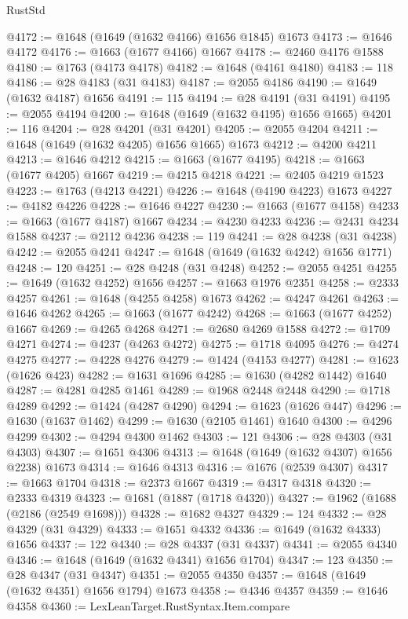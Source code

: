 \begin{lexlean}{RustStd}
\begin{coremodule}
{\begin{coremodule}
{{{{{{{{{{{{{{{{{{{{{{{{{{{{{{{{{{{{{{{{{{{{@4172 := @1648 (@1649 (@1632 @4166) @1656 @1845) @1673
@4173 := @1646 @4172
@4176 := @1663 (@1677 @4166) @1667
@4178 := @2460 @4176 @1588
@4180 := @1763 (@4173 @4178)
@4182 := @1648 (@4161 @4180)
@4183 := 118
@4186 := @28 @4183 (@31 @4183)
@4187 := @2055 @4186
@4190 := @1649 (@1632 @4187) @1656
@4191 := 115
@4194 := @28 @4191 (@31 @4191)
@4195 := @2055 @4194
@4200 := @1648 (@1649 (@1632 @4195) @1656 @1665)
@4201 := 116
@4204 := @28 @4201 (@31 @4201)
@4205 := @2055 @4204
@4211 := @1648 (@1649 (@1632 @4205) @1656 @1665) @1673
@4212 := @4200 @4211
@4213 := @1646 @4212
@4215 := @1663 (@1677 @4195)
@4218 := @1663 (@1677 @4205) @1667
@4219 := @4215 @4218
@4221 := @2405 @4219 @1523
@4223 := @1763 (@4213 @4221)
@4226 := @1648 (@4190 @4223) @1673
@4227 := @4182 @4226
@4228 := @1646 @4227
@4230 := @1663 (@1677 @4158)
@4233 := @1663 (@1677 @4187) @1667
@4234 := @4230 @4233
@4236 := @2431 @4234 @1588
@4237 := @2112 @4236
@4238 := 119
@4241 := @28 @4238 (@31 @4238)
@4242 := @2055 @4241
@4247 := @1648 (@1649 (@1632 @4242) @1656 @1771)
@4248 := 120
@4251 := @28 @4248 (@31 @4248)
@4252 := @2055 @4251
@4255 := @1649 (@1632 @4252) @1656
@4257 := @1663 @1976 @2351
@4258 := @2333 @4257
@4261 := @1648 (@4255 @4258) @1673
@4262 := @4247 @4261
@4263 := @1646 @4262
@4265 := @1663 (@1677 @4242)
@4268 := @1663 (@1677 @4252) @1667
@4269 := @4265 @4268
@4271 := @2680 @4269 @1588
@4272 := @1709 @4271
@4274 := @4237 (@4263 @4272)
@4275 := @1718 @4095
@4276 := @4274 @4275
@4277 := @4228 @4276
@4279 := @1424 (@4153 @4277)
@4281 := @1623 (@1626 @423)
@4282 := @1631 @1696
@4285 := @1630 (@4282 @1442) @1640
@4287 := @4281 @4285 @1461
@4289 := @1968 @2448 @2448
@4290 := @1718 @4289
@4292 := @1424 (@4287 @4290)
@4294 := @1623 (@1626 @447)
@4296 := @1630 (@1637 @1462)
@4299 := @1630 (@2105 @1461) @1640
@4300 := @4296 @4299
@4302 := @4294 @4300 @1462
@4303 := 121
@4306 := @28 @4303 (@31 @4303)
@4307 := @1651 @4306
@4313 := @1648 (@1649 (@1632 @4307) @1656 @2238) @1673
@4314 := @1646 @4313
@4316 := @1676 (@2539 @4307)
@4317 := @1663 @1704
@4318 := @2373 @1667
@4319 := @4317 @4318
@4320 := @2333 @4319
@4323 := @1681 (@1887 (@1718 @4320))
@4327 := @1962 (@1688 (@2186 (@2549 @1698)))
@4328 := @1682 @4327
@4329 := 124
@4332 := @28 @4329 (@31 @4329)
@4333 := @1651 @4332
@4336 := @1649 (@1632 @4333) @1656
@4337 := 122
@4340 := @28 @4337 (@31 @4337)
@4341 := @2055 @4340
@4346 := @1648 (@1649 (@1632 @4341) @1656 @1704)
@4347 := 123
@4350 := @28 @4347 (@31 @4347)
@4351 := @2055 @4350
@4357 := @1648 (@1649 (@1632 @4351) @1656 @1794) @1673
@4358 := @4346 @4357
@4359 := @1646 @4358
@4360 := LexLeanTarget.RustSyntax.Item.compare
}}}}}}}}}}}}}}}}}}}}}}}}}}}}}}}}}}}}}}}}}}}}
\end{coremodule}}
\end{coremodule}
\end{lexlean}
